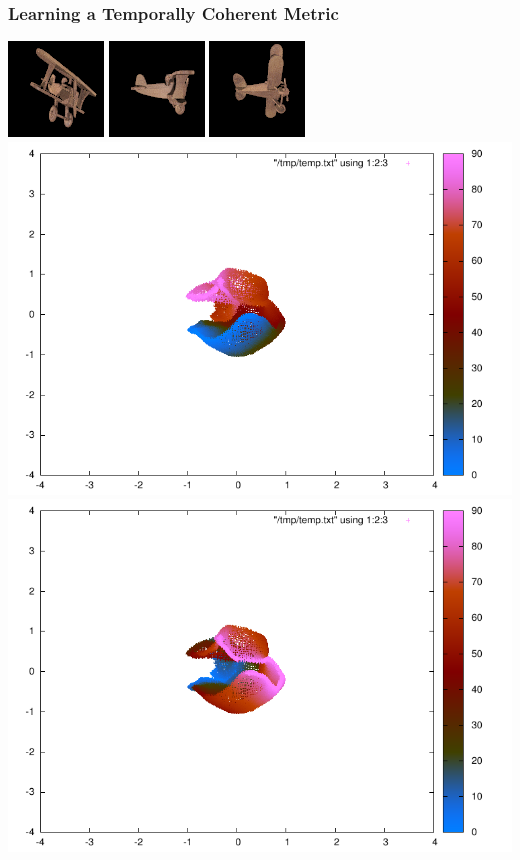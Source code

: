 \documentclass{beamer}
\begin{document}
\begin{frame}
\frametitle{Learning a Temporally Coherent Metric} 
\begin{center}
\includegraphics[scale=0.5]{./images/TAE/toyplane.png} 
\includegraphics[scale=0.5]{./images/TAE/toyplane2.png} 
\includegraphics[scale=0.5]{./images/TAE/toyplane3.png} \\
\includegraphics[scale=0.5,trim = 120 100 130 70, clip]{./images/TAE/drlim1.pdf}
\includegraphics[scale=0.5,trim = 120 100 130 70, clip]{./images/TAE/drlim2.pdf}\\

\end{center}
\end{frame}
\end{document}
